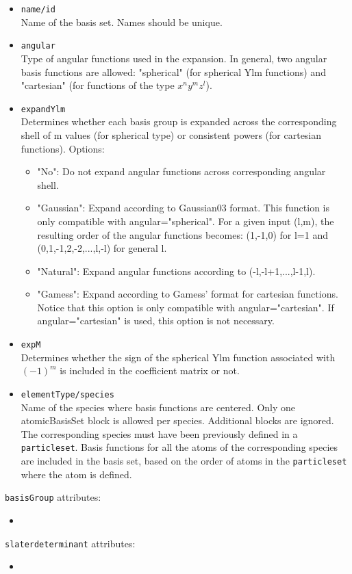 \begin{itemize}
\item \texttt{name/id}\\
Name of the basis set. Names should be unique.
\item \texttt{angular}\\
Type of angular functions used in the expansion. In general, two angular basis functions are allowed: "spherical" (for spherical Ylm functions) and "cartesian" (for functions of the type $x^{n}y^{m}z^{l}$).  
\item \texttt{expandYlm}\\
Determines whether each basis group is expanded across the corresponding shell of m values (for spherical type) or consistent powers (for cartesian functions). Options:
\begin{itemize}
\item "No": Do not expand angular functions across corresponding angular shell.
\item "Gaussian": Expand according to Gaussian03 format. This function is only compatible with angular="spherical". For a given input (l,m), the resulting order of the angular functions becomes: (1,-1,0) for l=1 and (0,1,-1,2,-2,...,l,-l) for general l.
\item "Natural": Expand angular functions according to (-l,-l+1,...,l-1,l). 
\item "Gamess": Expand according to Gamess' format for cartesian functions. Notice that this option is only compatible with angular="cartesian". If angular="cartesian" is used, this option is not necessary.
\end{itemize}
\item \texttt{expM}\\ 
Determines whether the sign of the spherical Ylm function associated with $(-1)^{m}$ is included in the coefficient matrix or not.
\item \texttt{elementType/species}\\
Name of the species where basis functions are centered. Only one atomicBasisSet block is allowed per species. Additional blocks are ignored. The corresponding species must have been previously defined in a \texttt{particleset}.
Basis functions for all the atoms of the corresponding species are included in the basis set, based on the order of atoms in the \texttt{particleset} where the atom is defined.
\end{itemize}


\texttt{basisGroup} attributes:

\begin{itemize}
\item \texttt{}\\
\end{itemize}

\texttt{slaterdeterminant} attributes:

\begin{itemize}
\item \texttt{}\\
\end{itemize}




